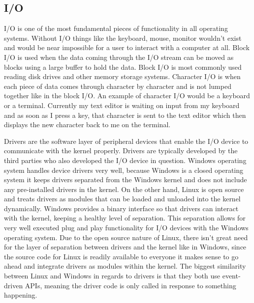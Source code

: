 \documentclass[10pt,serif,draftclsnofoot,onecolumn]{IEEEtran}
\begin{document}
	\subsection{I/O}
	\par
			I/O is one of the most fundamental pieces of functionality in all operating systems. Without I/O things like the keyboard, mouse, monitor wouldn't exist and would be near impossible for a user to interact with a computer at all. Block I/O is used when the data coming through the I/O stream can be moved as blocks using a large buffer to hold the data. Block I/O is most commonly used reading disk drives and other memory storage systems. Character I/O is when each piece of data comes through character by character and is not lumped together like in the block I/O. An example of character I/O would be a keyboard or a terminal. Currently my text editor is waiting on input from my keyboard and as soon as I press a key, that character is sent to the text editor which then displays the new character back to me on the terminal.
	\newline
	\newline
	\par
			Drivers are the software layer of peripheral devices that enable the I/O device to communicate with the kernel properly. Drivers are typically developed by the third parties who also developed the I/O device in question. Windows operating system handles device drivers very well, because Windows is a closed operating system it keeps drivers separated from the Windows kernel and does not include any pre-installed drivers in the kernel. On the other hand, Linux is open source and treats drivers as modules that can be loaded and unloaded into the kernel dynamically\cite{12}. Windows provides a binary interface so that drivers can interact with the kernel, keeping a healthy level of separation. This separation allows for very well executed plug and play functionality for I/O devices with the Windows operating system. Due to the open source nature of Linux, there isn't great need for the layer of separation between drivers and the kernel like in Windows, since the source code for Linux is readily available to everyone it makes sense to go ahead and integrate drivers as modules within the kernel. The biggest similarity between Linux and Windows in regards to drivers is that they both use event-driven APIs, meaning the driver code is only called in response to something happening\cite{12}.
	\newline
	\newline
\end{document}
